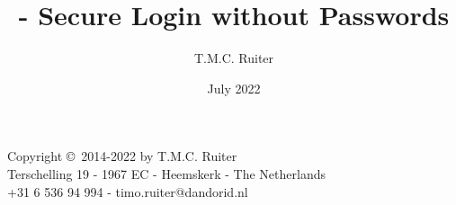 %
%



\begin{titlepage}
\title{\TIMO - Secure Login without Passwords}
\author{T.M.C. Ruiter}
\date{July 2022}
\maketitle
\begin{center}
\small
Copyright \copyright\ 2014-2022 by T.M.C. Ruiter\\
Terschelling 19 - 1967 EC - Heemskerk - The Netherlands\\
+31 6 536 94 994 - timo.ruiter@dandorid.nl
\normalsize
\end{center}
\end{titlepage}




